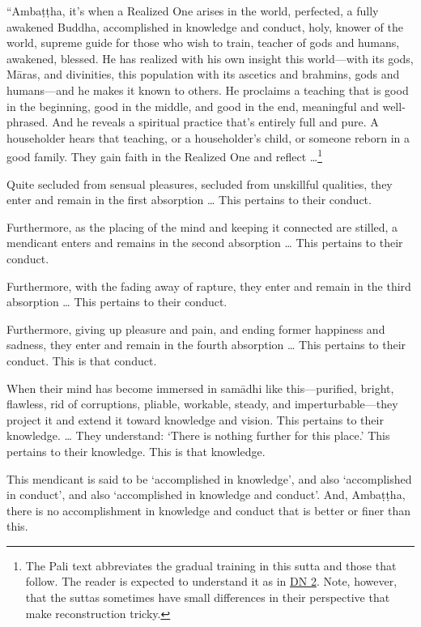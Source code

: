 \documentclass[12pt,openany]{book}%
\begin{document}
“\textsanskrit{Ambaṭṭha}, it’s when a Realized One arises in the world, perfected, a fully awakened Buddha, accomplished in knowledge and conduct, holy, knower of the world, supreme guide for those who wish to train, teacher of gods and humans, awakened, blessed. He has realized with his own insight this world—with its gods, \textsanskrit{Māras}, and divinities, this population with its ascetics and brahmins, gods and humans—and he makes it known to others. He proclaims a teaching that is good in the beginning, good in the middle, and good in the end, meaningful and well-phrased. And he reveals a spiritual practice that’s entirely full and pure. A householder hears that teaching, or a householder’s child, or someone reborn in a good family. They gain faith in the Realized One and reflect …\footnote{The Pali text abbreviates the gradual training in this sutta and those that follow. The reader is expected to understand it as in \href{https://suttacentral.net/dn2/en/sujato}{DN 2}. Note, however, that the suttas sometimes have small differences in their perspective that make reconstruction tricky. } 

Quite secluded from sensual pleasures, secluded from unskillful qualities, they enter and remain in the first absorption … This pertains to their conduct. 

Furthermore, as the placing of the mind and keeping it connected are stilled, a mendicant enters and remains in the second absorption … This pertains to their conduct. 

Furthermore, with the fading away of rapture, they enter and remain in the third absorption … This pertains to their conduct. 

Furthermore, giving up pleasure and pain, and ending former happiness and sadness, they enter and remain in the fourth absorption … This pertains to their conduct. This is that conduct. 

When their mind has become immersed in \textsanskrit{samādhi} like this—purified, bright, flawless, rid of corruptions, pliable, workable, steady, and imperturbable—they project it and extend it toward knowledge and vision. This pertains to their knowledge. … They understand: ‘There is nothing further for this place.’ This pertains to their knowledge. This is that knowledge. 

This mendicant is said to be ‘accomplished in knowledge’, and also ‘accomplished in conduct’, and also ‘accomplished in knowledge and conduct’. And, \textsanskrit{Ambaṭṭha}, there is no accomplishment in knowledge and conduct that is better or finer than this. 
\end{document}
